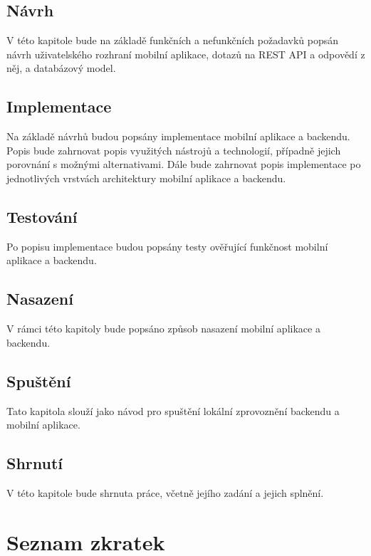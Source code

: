 \documentclass[czech,master,unicode]{ctufit-thesis}
\theoremstyle{plain}
\theoremstyle{definition}
\theoremstyle{remark}
\numberwithin{theorem}{chapter}
\begin{document}
\begin{summarypage}
\section*{Návrh}
V této kapitole bude na základě funkčních a nefunkčních požadavků popsán návrh uživatelského rozhraní mobilní aplikace, dotazů na REST API a odpovědí z něj, a databázový model.

\section*{Implementace}
Na základě návrhů budou popsány implementace mobilní aplikace a backendu. Popis bude zahrnovat popis využitých nástrojů a technologií, případně jejich porovnání s možnými alternativami. Dále bude zahrnovat popis implementace po jednotlivých vrstvách architektury mobilní aplikace a backendu.

\section*{Testování}
Po popisu implementace budou popsány testy ověřující funkčnost mobilní aplikace a backendu.

\section*{Nasazení}
V rámci této kapitoly bude popsáno způsob nasazení mobilní aplikace a backendu.

\section*{Spuštění}
Tato kapitola slouží jako návod pro spuštění lokální zprovoznění backendu a mobilní aplikace.

\section*{Shrnutí}
V této kapitole bude shrnuta práce, včetně jejího zadání a jejich splnění.

\end{summarypage}

\chapter{Seznam zkratek}
	
\end{document}
